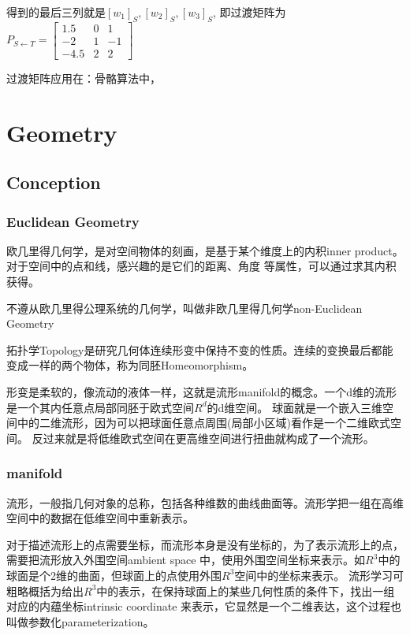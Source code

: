 得到的最后三列就是$[w_1]_S, [w_2]_S,[w_3]_S$, 即过渡矩阵为
\begin{math}
    P_{S \leftarrow T} = \begin{bmatrix}
        1.5 & 0 & 1 \\
        -2 & 1 & -1 \\
        -4.5 & 2 & 2
    \end{bmatrix}
\end{math}

过渡矩阵应用在：骨骼算法中，

\chapter{Geometry}

\section{Conception}

\subsection{Euclidean Geometry}
欧几里得几何学，是对空间物体的刻画，是基于某个维度上的内积inner product。对于空间中的点和线，感兴趣的是它们的距离、角度
等属性，可以通过求其内积获得。

不遵从欧几里得公理系统的几何学，叫做非欧几里得几何学non-Euclidean Geometry

拓扑学Topology是研究几何体连续形变中保持不变的性质。连续的变换最后都能变成一样的两个物体，称为同胚Homeomorphism。

形变是柔软的，像流动的液体一样，这就是流形manifold的概念。一个d维的流形是一个其内任意点局部同胚于欧式空间$R^d$的d维空间。
球面就是一个嵌入三维空间中的二维流形，因为可以把球面任意点周围(局部小区域)看作是一个二维欧式空间。
反过来就是将低维欧式空间在更高维空间进行扭曲就构成了一个流形。

\subsection{manifold}

流形，一般指几何对象的总称，包括各种维数的曲线曲面等。流形学把一组在高维空间中的数据在低维空间中重新表示。

对于描述流形上的点需要坐标，而流形本身是没有坐标的，为了表示流形上的点，需要把流形放入外围空间ambient space
中，使用外围空间坐标来表示。如$R^3$中的球面是个2维的曲面，但球面上的点使用外围$R^3$空间中的坐标来表示。
流形学习可粗略概括为给出$R^3$中的表示，在保持球面上的某些几何性质的条件下，找出一组对应的内蕴坐标intrinsic coordinate 
来表示，它显然是一个二维表达，这个过程也叫做参数化parameterization。

